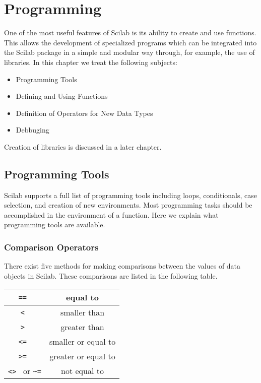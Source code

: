 
\chapter{Programming}
\label{ch4}

        One of the most useful features of Scilab is its ability
to create and use functions.  This allows the development of specialized
programs which can be integrated into the Scilab package in a simple and
modular way through, for example, the use of libraries.  In this chapter we 
treat the following subjects:
\begin{itemize}
        \item Programming Tools
        \item Defining and Using Functions
        \item Definition of Operators for New Data Types
        \item{Debbuging}
\end{itemize}   
Creation of libraries is discussed in a later chapter.

\section{Programming Tools}

        Scilab supports a full list of programming tools
including loops, conditionals, case selection,
and creation of new environments.  Most programming tasks
should be accomplished in the environment of a function.
Here we explain what programming tools are available.

\subsection{Comparison Operators}
There exist five methods for making comparisons between the
values of data objects in Scilab. These comparisons are listed
in the following table.

\begin{center}
\begin{tabular}{|c|c|}
\hline
{\tt == }  & equal to \\ \hline
{\tt < } & smaller than \\ \hline
{\tt > } &  greater than \\ \hline
{\tt <= } & smaller or equal to \\ \hline
{\tt >= } & greater or equal to \\ \hline
{\tt <> } or {\verb!~=!} & not equal to \\ \hline
\end{tabular}
\end{center}

